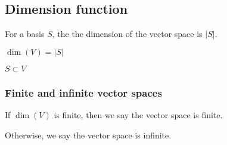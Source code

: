 
\subsection{Dimension function}

For a basis \(S\), the the dimension of the vector space is \(|S|\).

\(\dim (V)=|S|\)

\(S\subset V\)

\subsubsection{Finite and infinite vector spaces}

If \(\dim (V) \) is finite, then we say the vector space is finite.

Otherwise, we say the vector space is infinite.

